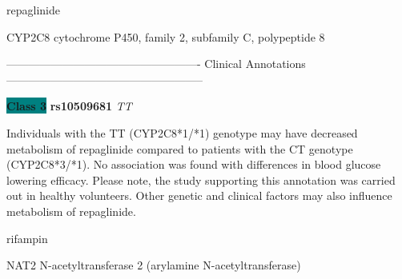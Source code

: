\documentclass{resume} %
\begin{document}
\begin{rSection}{ repaglinide }
\begin{rSubsection}{ CYP2C8 }{ cytochrome P450, family 2, subfamily C, polypeptide 8 }{}{}
\item[] ---------------------------------------------------- Clinical Annotations -----------------------------------------------------\newline
\item \textbf{\colorbox{teal} {Class 3}} \textbf{ rs10509681 } \textit{ TT }
\item[] Individuals with the TT (CYP2C8*1/*1) genotype may have decreased metabolism of repaglinide compared to patients with the CT genotype (CYP2C8*3/*1). No association was found with differences in blood glucose lowering efficacy. Please note, the study supporting this annotation was carried out in healthy volunteers. Other genetic and clinical factors may also influence metabolism of repaglinide.
\end{rSubsection}

\end{rSection}\begin{rSection}{ rifampin }
\item[]

\begin{rSubsection}{ NAT2 }{ N-acetyltransferase 2 (arylamine N-acetyltransferase) }{}{}
\item[]


\end{rSubsection}
\end{rSection}
\end{document}
